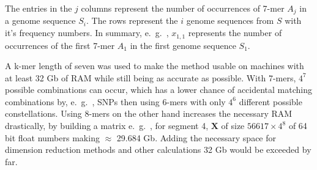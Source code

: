 The entries in the $j$ columns represent the number of occurrences of 7-mer $A_j$ in a genome sequence $S_i$. The rows represent the $i$ genome sequences from $S$ with it's frequency numbers. In summary, e.~g.~, $x_{1,1}$ represents the number of occurrences of the first 7-mer $A_1$ in the first genome sequence $S_1$.

A k-mer length of seven was used to make the method usable on machines with at least 32 Gb of RAM while still being as accurate as possible. With 7-mers, $4^7$ possible combinations can occur, which has a lower chance of accidental matching combinations by, e.~g.~, \glspl{SNP} then using 6-mers with only $4^6$ different possible constellations. Using 8-mers on the other hand increases the necessary RAM drastically, by building a matrix e.~g.~, for segment 4, $\mathbf{X}$ of size $56617 \times 4^8$ of 64 bit float numbers making $\approx$ 29.684 Gb. Adding the necessary space for dimension reduction methods and other calculations 32 Gb would be exceeded by far. 
